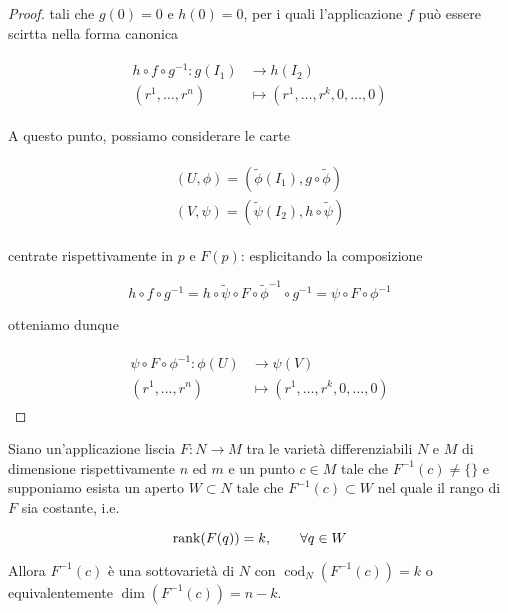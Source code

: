 \begin{proof}
	tali che $ g(0)=0 $ e $ h(0)=0 $, per i quali l'applicazione $ f $ può essere scirtta nella forma canonica
	
	\begin{align}
		\begin{split}
			h \circ f \circ g^{-1} : g(I_{1}) &\to h(I_{2})\\
			(r^{1},\dots,r^{n}) &\mapsto (r^{1},\dots,r^{k},0,\dots,0)
		\end{split}
	\end{align}

	A questo punto, possiamo considerare le carte
	
	\begin{align}
		\begin{split}
			(U,\phi) = (\tilde{\phi}(I_{1}),g \circ \tilde{\phi})\\
			(V,\psi) = (\tilde{\psi}(I_{2}),h \circ \tilde{\psi})
		\end{split}
	\end{align}

	centrate rispettivamente in $ p $ e $ F(p) $: esplicitando la composizione
	
	\begin{equation}
		h \circ f \circ g^{-1} = h \circ \tilde{\psi} \circ F \circ \tilde{\phi}^{-1} \circ g^{-1} = \psi \circ F \circ \phi^{-1}
	\end{equation}

	otteniamo dunque
	
	\begin{align}
		\begin{split}
			\psi \circ F \circ \phi^{-1} : \phi(U) &\to \psi(V)\\
			(r^{1},\dots,r^{n}) &\mapsto (r^{1},\dots,r^{k},0,\dots,0)
		\end{split}
	\end{align}
\end{proof}

\begin{theorem}
	Siano un'applicazione liscia $ F : N \to M $ tra le varietà differenziabili $ N $ e $ M $ di dimensione rispettivamente $ n $ ed $ m $ e un punto $ c \in M $ tale che $ F^{-1}(c) \neq \{\} $ e supponiamo esista un aperto $ W \subset N $ tale che $ F^{-1}(c) \subset W $ nel quale il rango di $ F $ sia costante, i.e.
	
	\begin{equation}
		\rank(F(q))=k, \qquad \forall q \in W
	\end{equation}

	Allora $ F^{-1}(c) $ è una sottovarietà di $ N $ con $ \operatorname{cod}_{N}(F^{-1}(c)) = k $ o equivalentemente $ \dim(F^{-1}(c)) = n-k $.
\end{theorem}

